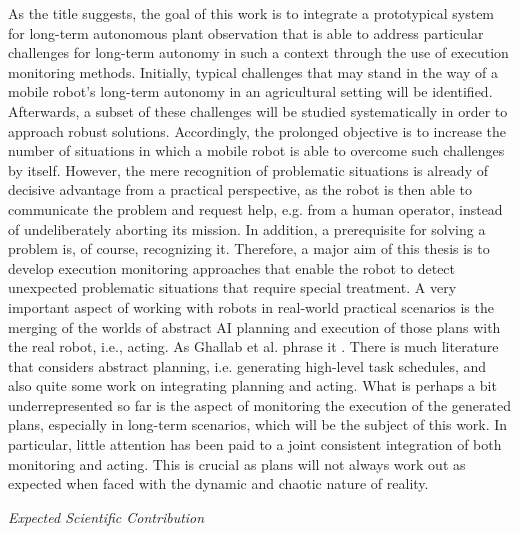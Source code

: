 \documentclass[english, master, utf8]{base/thesis_KBS}
\begin{document}
\noindent
As the title suggests, the goal of this work is to integrate a prototypical system for long-term autonomous plant observation that is able to address 
particular challenges for long-term autonomy in such a context through the use of execution monitoring methods. Initially, typical challenges that may stand in the way of a mobile
robot's long-term autonomy in an agricultural setting will be identified. Afterwards, a subset of these challenges will be studied systematically in order to 
approach robust solutions. Accordingly, the prolonged objective is to increase the number of situations in which a mobile robot is able to 
overcome such challenges by itself. However, the mere recognition of problematic situations is already of decisive advantage from a practical perspective,
as the robot is then able to communicate the problem and request help, e.g. from a human operator, instead of undeliberately aborting its mission.
In addition, a prerequisite for solving a problem is, of course, recognizing it. Therefore, a major aim of this thesis is to develop execution monitoring
approaches that enable the robot to detect unexpected problematic situations that require special treatment.
A very important aspect of working with robots in real-world practical scenarios is the merging of the worlds of abstract AI planning and execution of those plans with
the real robot, i.e., acting. As Ghallab et al. phrase it . \cite{GNT:2016} There is much literature that considers abstract planning, i.e. generating high-level
task schedules, and also quite some work on integrating planning and acting. What is perhaps a bit underrepresented so far is the aspect of monitoring the execution of the generated
plans, especially in long-term scenarios, which will be the subject of this work. In particular, little attention has been paid to a joint consistent integration of both monitoring
and acting. \cite{Ingrand:2017} This is crucial as plans will not always work out as expected when faced with the dynamic and chaotic nature of reality.\newline

\noindent
\textit{Expected Scientific Contribution}\newline
\end{document}
